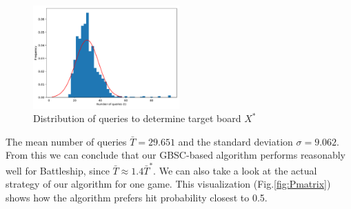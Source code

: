 \begin{figure}[htb]
    \centering
    \includegraphics[width=0.5\textwidth]{figure/1000_hist.pdf}
    \caption{Distribution of queries to determine target board $X^*$}
    \label{fig:Hist1000}
\end{figure}
The mean number of queries $\bar{T}= 29.651$ and the standard deviation $\sigma =  9.062$. From this we can conclude that our GBSC-based algorithm performs reasonably well for Battleship, since $\bar{T}\approx 1.4 \bar{T}^*$. We can also take a look at the actual strategy of our algorithm for one game. This visualization (Fig.\ref{fig:Pmatrix}) shows how the algorithm prefers hit probability closest to 0.5.
